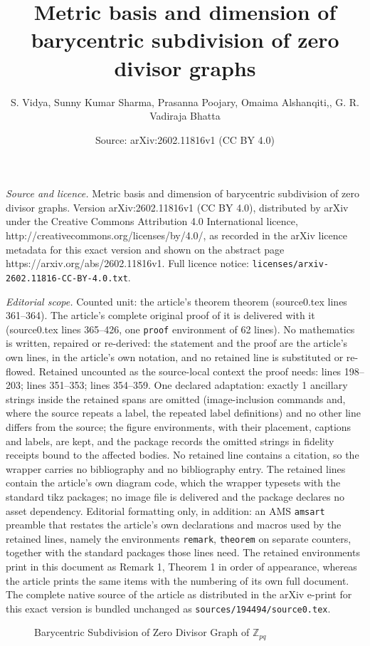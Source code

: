 \documentclass[10pt,a4paper]{amsart}
\title{Metric basis and dimension of barycentric subdivision of zero divisor graphs}
\author{S. Vidya, Sunny Kumar Sharma, Prasanna Poojary, Omaima Alshanqiti,, G. R. Vadiraja Bhatta}
\date{Source: arXiv:2602.11816v1 (CC BY 4.0)}
\begin{document}
\maketitle

\noindent\emph{Source and licence.} Metric basis and dimension of barycentric subdivision of zero divisor graphs. Version arXiv:2602.11816v1 (CC BY 4.0), distributed by arXiv under the Creative Commons Attribution 4.0 International licence, http://creativecommons.org/licenses/by/4.0/, as recorded in the arXiv licence metadata for this exact version and shown on the abstract page https://arxiv.org/abs/2602.11816v1. Full licence notice: \texttt{licenses/arxiv-2602.11816-CC-BY-4.0.txt}.\par\smallskip

\noindent\textit{Editorial scope.} Counted unit: the article's theorem theorem (source0.tex lines 361--364). The article's complete original proof of it is delivered with it (source0.tex lines 365--426, one \texttt{proof} environment of 62 lines). No mathematics is written, repaired or re-derived: the statement and the proof are the article's own lines, in the article's own notation, and no retained line is substituted or re-flowed.  Retained uncounted as the source-local context the proof needs: lines 198--203; lines 351--353; lines 354--359.  One declared adaptation: exactly 1 ancillary strings inside the retained spans are omitted (image-inclusion commands and, where the source repeats a label, the repeated label definitions) and no other line differs from the source; the figure environments, with their placement, captions and labels, are kept, and the package records the omitted strings in fidelity receipts bound to the affected bodies.  No retained line contains a citation, so the wrapper carries no bibliography and no bibliography entry.  The retained lines contain the article's own diagram code, which the wrapper typesets with the standard tikz packages; no image file is delivered and the package declares no asset dependency.  Editorial formatting only, in addition: an AMS \texttt{amsart} preamble that restates the article's own declarations and macros used by the retained lines, namely the environments \texttt{remark}, \texttt{theorem} on separate counters, together with the standard packages those lines need.  The retained environments print in this document as Remark 1, Theorem 1 in order of appearance, whereas the article prints the same items with the numbering of its own full document.  The complete native source of the article as distributed in the arXiv e-print for this exact version is bundled unchanged as \texttt{sources/194494/source0.tex}.
\begin{figure}[ht!]
    \centering
    
    \caption{Barycentric Subdivision of Zero Divisor Graph of $\mathbb{Z}_{pq}$}
    \label{fig:4}
\end{figure}
\end{document}
